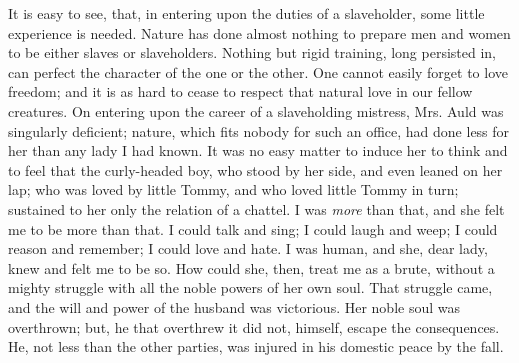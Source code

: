 It is easy to see, that, in entering upon the duties of a slaveholder,
some little experience is needed. Nature has done almost nothing to
prepare men and women to be either slaves or slaveholders. Nothing but
rigid training, long persisted in, can perfect the character of the one
or the other. One cannot easily forget to love freedom; and it is as
hard to cease to respect that natural love in our fellow creatures. On
entering upon the career of a slaveholding mistress, Mrs. Auld was
singularly deficient; nature, which fits nobody for such an office, had
done less for her than any lady I had known. It was no easy matter to
induce her to think and to feel that the curly-headed boy, who stood by
her side, and even leaned on her lap; who was loved by little Tommy, and
who loved little Tommy in turn; sustained to her only the relation of a
chattel. I was \emph{more} than that, and she felt {}me to be more than
that. I could talk and sing; I could laugh and weep; I could reason and
remember; I could love and hate. I was human, and she, dear lady, knew
and felt me to be so. How could she, then, treat me as a brute, without
a mighty struggle with all the noble powers of her own soul. That
struggle came, and the will and power of the husband was victorious. Her
noble soul was overthrown; but, he that overthrew it did not, himself,
escape the consequences. He, not less than the other parties, was
injured in his domestic peace by the fall.

